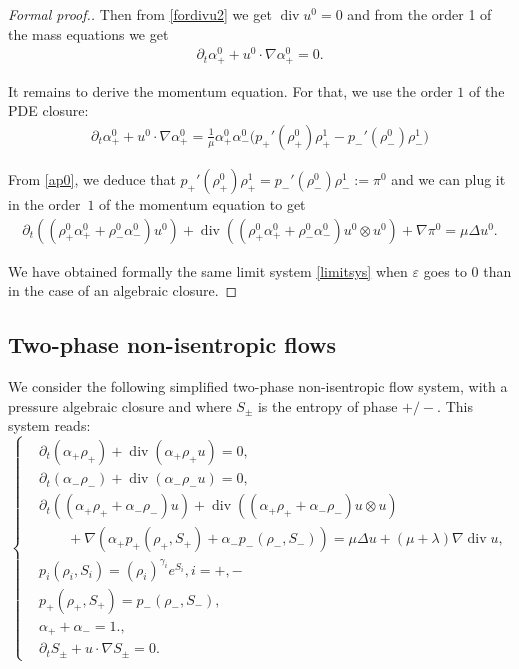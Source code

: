 \documentclass[11pt, twoside, a4paper]{article}
\theoremstyle{plain}
\theoremstyle{remark}
\numberwithin{equation}{section}
\renewcommand{\div}{\operatorname{div}}
\newcommand{\dt}{\partial_t}
\newcommand{\eps}{\varepsilon}
\newcommand{\ap}{\alpha_+}
\newcommand{\am}{\alpha_-}
\newcommand{\rp}{\rho_+}
\newcommand{\rmi}{\rho_-}
\begin{document}
\begin{proof} [Formal proof.]
Then from \eqref{fordivu2} we get $\div u^0 =0$ and from the order 1 of the mass equations we get 
\begin{align}
    \dt \ap^0 + u^0 \cdot \nabla \ap^0 =0.\label{ap0}
\end{align}

It remains to derive the momentum equation. For that, we use the order $1$ of the PDE closure:
\begin{align*}
    \dt \ap^0 + u^0 \cdot \nabla \ap^0 = \frac{1}{\mu} \ap^0 \am^0 \Big( p_+'(\rp^0)\rp^1 - p_-'(\rmi^0)\rmi^1 \Big)
\end{align*}

From \eqref{ap0}, we deduce that $p_+'(\rp^0)\rp^1 = p_-'(\rmi^0)\rmi^1 := \pi^0$ and we can plug it in the order~$1$ of the momentum equation to get
\begin{align*}
    \dt(\left(\rp^0 \ap^0 + \rmi^0 \am^0 \right) u^0) + \div( \left(\rp^0 \ap^0 + \rmi^0 \am^0 \right) u^0\otimes u^0) + \nabla \pi^0 = \mu \Delta u^0.
\end{align*}

We have obtained formally the same limit system \eqref{limitsys} when $\eps$ goes to 0 than in the case of an algebraic closure.
\end{proof}

\subsection{Two-phase non-isentropic flows}

We consider the following simplified two-phase non-isentropic flow system, with a pressure algebraic closure and where $S_\pm$ is the entropy of phase $+/-$. This system reads:
\begin{equation*}
    \left\{
        \begin{aligned}
            &\partial_t (\alpha_+ \rho_+) + \div(\alpha_+\rho_+u) = 0,\\
            &\partial_t (\alpha_- \rho_-) + \div(\alpha_-\rho_-u) = 0,\\
            &\partial_t ((\alpha_+ \rho_+ + \alpha_-\rho_-)u) + \div((\alpha_+\rho_+ + \alpha_-\rho_-)u\otimes u) \\
            & \quad \quad + \nabla (\alpha_+p_+(\rho_+,S_+)+\alpha_- p_-(\rho_-,S_-)) = \mu \Delta u + (\mu + \lambda)\nabla \div u,\\
            &p_i(\rho_i,S_i) = (\rho_i)^{\gamma_i}e^{S_i}, i=+,-\\
            &p_+(\rho_+,S_+) = p_-(\rho_-,S_-),\\
            &\alpha_+ + \alpha_- = 1.,\\
            &\dt S_\pm + u \cdot \nabla S_\pm = 0.
        \end{aligned}
    \right.
\end{equation*}
\end{document}
